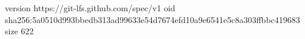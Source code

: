 version https://git-lfs.github.com/spec/v1
oid sha256:5a0510d993bbedb313ad99633e54d7674efd10a9e6541e5c8a303ffbbc419683
size 622
